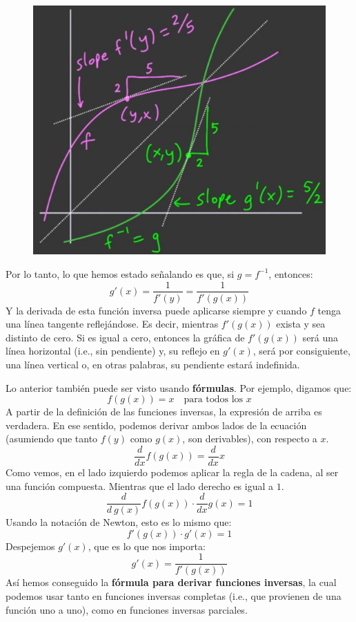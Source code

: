 \documentclass[12pt]{article}
\begin{document}
\begin{figure}[hbt!]
\centering
\includegraphics[scale=0.5]{img/rel-deriv-inv-fun-4.jpg}
\end{figure}

Por lo tanto, lo que hemos estado señalando es que, si $g = f^{-1}$, entonces:
\[g'(x) = \frac{1}{f'(y)} = \frac{1}{f'(g(x))}\]
Y la derivada de esta función inversa puede aplicarse siempre y cuando $f$ tenga una línea tangente reflejándose. Es decir, mientras $f'(g(x))$ exista y sea distinto de cero. Si es igual a cero, entonces la gráfica de $f'(g(x))$ será una línea horizontal (i.e., sin pendiente) y, su reflejo en $g'(x)$, será por consiguiente, una línea vertical o, en otras palabras, su pendiente estará indefinida.

Lo anterior también puede ser visto usando \textbf{fórmulas}. Por ejemplo, digamos que:
\[f(g(x)) = x \quad \text{para todos los }x\]
A partir de la definición de las funciones inversas, la expresión de arriba es verdadera. En ese sentido, podemos derivar ambos lados de la ecuación (asumiendo que tanto $f(y)$ como $g(x)$, son derivables), con respecto a $x$.
\[\frac{d}{dx}f(g(x)) = \frac{d}{dx} x\]
Como vemos, en el lado izquierdo podemos aplicar la regla de la cadena, al ser una función compuesta. Mientras que el lado derecho es igual a $1$.
\[\frac{d}{d \ g(x)}f(g(x)) \cdot \frac{d}{dx} g(x) = 1\]
Usando la notación de Newton, esto es lo mismo que:
\[f'(g(x)) \cdot g'(x) = 1\]
Despejemos $g'(x)$, que es lo que nos importa:
\[g'(x) = \frac{1}{f'(g(x))}\]
Así hemos conseguido la \textbf{fórmula para derivar funciones inversas}, la cual podemos usar tanto en funciones inversas completas (i.e., que provienen de una función uno a uno), como en funciones inversas parciales.
\end{document}
